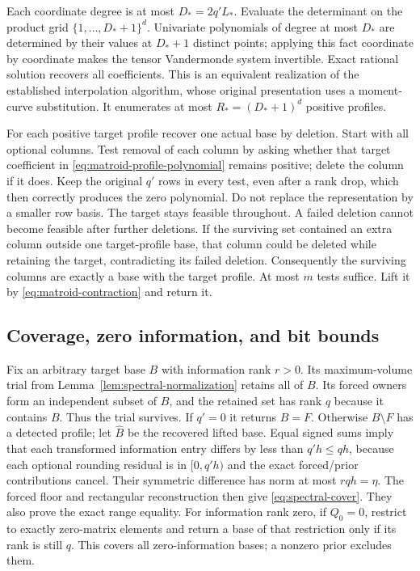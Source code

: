 Each coordinate degree is at most $D_*=2q'L_*$. Evaluate the determinant
on the product grid $\{1,\ldots,D_*+1\}^d$. Univariate polynomials of
degree at most $D_*$ are determined by their values at $D_*+1$ distinct
points; applying this fact coordinate by coordinate makes the tensor
Vandermonde system invertible. Exact rational solution recovers all
coefficients. This is an equivalent realization of the established
interpolation algorithm, whose original presentation uses a moment-curve
substitution. It enumerates at most $R_*=(D_*+1)^d$ positive profiles.

For each positive target profile recover one actual base by deletion.
Start with all optional columns. Test removal of each column by asking
whether that target coefficient in \eqref{eq:matroid-profile-polynomial}
remains positive; delete the column if it does. Keep the original $q'$ rows
in every test, even after a rank drop, which then correctly produces the
zero polynomial. Do not replace the representation by a smaller row basis.
The target stays feasible throughout. A failed deletion cannot become
feasible after further deletions. If the surviving set contained an extra
column outside one target-profile base, that column could be deleted while
retaining the target, contradicting its failed deletion. Consequently the
surviving columns are exactly a base with the target profile. At most $m$
tests suffice. Lift it by \eqref{eq:matroid-contraction} and return it.

\subsection{Coverage, zero information, and bit bounds}
Fix an arbitrary target base $B$ with information rank $r>0$. Its
maximum-volume trial from Lemma~\ref{lem:spectral-normalization} retains
all of $B$. Its forced owners form an independent subset of $B$, and the
retained set has rank $q$ because it contains $B$. Thus the trial survives.
If $q'=0$ it returns $B=F$. Otherwise $B\setminus F$ has a detected profile;
let $\widehat B$ be the recovered lifted base. Equal signed sums imply that
each transformed information entry differs by less than $q'h\le qh$,
because each optional rounding residual is in $[0,q'h)$ and the exact
forced/prior contributions cancel. Their symmetric difference has norm
at most $rqh=\eta$. The forced floor and rectangular reconstruction then
give \eqref{eq:spectral-cover}. They also prove the exact range equality.
For information rank zero, if $Q_0=0$, restrict to exactly zero-matrix
elements and return a base of that restriction only if its rank is still
$q$. This covers all zero-information bases; a nonzero prior excludes them.

